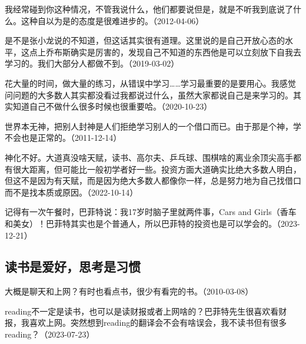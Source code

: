 我经常碰到你这种情况，不管我说什么，他们都要说但是，就是不听我到底说了什么。这种自以为是的态度是很难进步的。（2012-04-06）


是不是张小龙说的不知道，但这话其实很有道理。这里说的是自己开放心态的水平，这点上乔布斯确实是厉害的，发现自己不知道的东西他是可以立刻放下自我去学习的。我们大部分人都做不到。（2019-03-02）


花大量的时间，做大量的练习，从错误中学习……学习最重要的是要用心。我感觉问问题的大多数人其实都没看过我都说过什么，虽然大家都说自己是来学习的。其实知道自己不做什么很多时候也很重要哈。（2020-10-23）


世界本无神，把别人封神是人们拒绝学习别人的一个借口而已。由于那是个神，学不会也是正常的。（2011-12-14）


神化不好。大道真没啥天赋，读书、高尔夫、乒乓球、围棋啥的离业余顶尖高手都有很大距离，但可能比一般初学者好一些。投资方面大道确实比绝大多数人明白，但这不是因为有天赋，而是因为绝大多数人都像你一样，总是努力地为自己找借口而不是找本质或原因。（2022-10-14）

记得有一次午餐时，巴菲特说：我17岁时脑子里就两件事，Cars and Girls（香车和美女）！巴菲特其实也是个普通人，所以巴菲特的投资也是可以学会的。（2023-12-21）

\subsection{读书是爱好，思考是习惯}


大概是聊天和上网？有时也看点书，很少有看完的书。（2010-03-08）

reading不一定是读书，也可以是读财报或者上网啥的？巴菲特先生很喜欢看财报，我喜欢上网。突然想到reading的翻译会不会有啥误会，我不读书但有很多reading？（2023-07-23）


